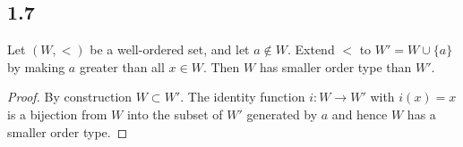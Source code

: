\subsection*{1.7} Let $(W, <)$ be a well-ordered set, and let $a \notin W$. Extend $<$ to $W' = W \cup \{a\}$ by making $a$ greater than all $x \in W$. Then $W$ has smaller order type than $W'$.

\begin{proof}
    By construction $W \subset W'$. The identity function $i: W \rightarrow W'$ with $i(x) = x$ is a bijection from $W$ into the subset of $W'$ generated by $a$ and hence $W$ has a smaller order type. 
\end{proof}

